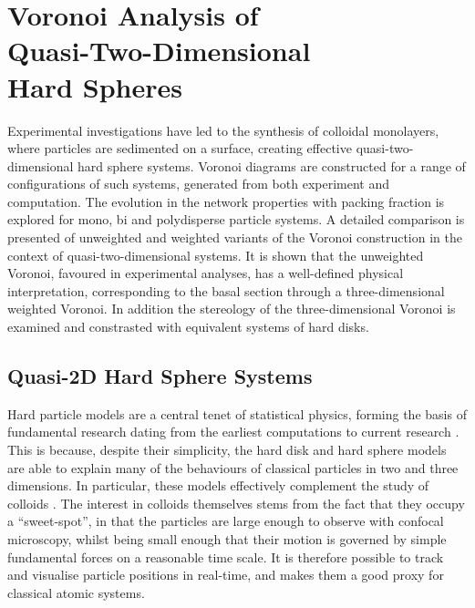 \chapter[Voronoi Analysis of Quasi\--Two\--Dimensional Hard Spheres]{Voronoi Analysis of \\ Quasi\--Two\--Dimensional \\ Hard Spheres} 
\label{ch:quasi2d}

\begin{chapterabstract}
Experimental investigations have led to the synthesis of colloidal monolayers, where particles are sedimented on a surface, creating effective quasi\--two\--dimensional hard sphere systems.
Voronoi diagrams are constructed for a range of configurations of such systems, generated from both experiment and computation.
The evolution in the network properties with packing fraction is explored for mono, bi and polydisperse particle systems.
A detailed comparison is presented of unweighted and weighted variants of the Voronoi construction in the context of quasi\--two\--dimensional systems.
It is shown that the \td{} unweighted Voronoi, favoured in experimental analyses, has a well\--defined physical interpretation, corresponding to the basal section through a three\--dimensional weighted Voronoi.
In addition the stereology of the three\--dimensional Voronoi is examined and constrasted with equivalent systems of hard disks.
\end{chapterabstract}

\section{Quasi\--2D Hard Sphere Systems}

Hard particle models are a central tenet of statistical physics, forming the basis of fundamental research dating from the earliest computations to current research \cite{Isobe2016}.
This is because, despite their simplicity, the hard disk and hard sphere models are able to explain many of the behaviours of classical particles in two and three dimensions.
In particular, these models effectively complement the study of colloids \cite{Pusey1986}.
The interest in colloids themselves stems from the fact that they occupy a ``sweet\--spot'', in that the particles are large enough to observe with confocal microscopy, whilst being small enough that their motion is governed by simple fundamental forces on a reasonable time scale. 
It is therefore possible to track and visualise particle positions in real\--time, and makes them a good proxy for classical atomic systems.

